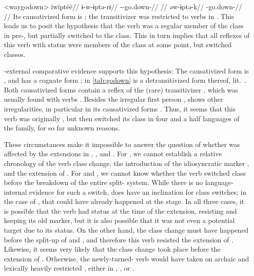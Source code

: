 \pex<waygodown>\wayana \parencite[][200]{wayanatavares2005}
\begingl
\glpreamble ïwïptëë//
\gla ɨ-w-ɨptə-rɨ//
\glb {}--go.down-//
\glft {}//
\endgl
{}
\begingl
\gla əw-ɨptə-k//
\glb {}-go.down-//
\glft {}//
\endgl
\xe
%
Its causativized form is  \parencite[255]{wayanatavares2005}; the transitivizer  was restricted to  verbs in \PC \parencite{gildea2019overview}.
This leads us to posit the hypothesis that the verb was a regular member of the  class in pre-\wayana, but partially switched to the  class.
This in turn implies that all reflexes of this verb with  status were members of the  class at some point, but switched classes.

\wayana-external comparative evidence supports this hypothesis:
The \arara causativized form is  \parencite[66]{alves2017arara}, and \kalina has a cognate form  \parencite[263]{courtz2008carib};   in \cref{tab:godown} is a detransitivized form thereof, lit.\ .
Both causativized forms contain a reflex of the (rare) transitivizer , which was usually found with  verbs \parencite{gildea2019overview}.
Besides the irregular first person , \trio {} shows other irregularities, in particular in its causativized forms \parencite[263]{triomeira1999}.
Thus, it seems that this verb was originally , but then switched its class in four and a half languages of the family, for so far unknown reasons.

These circumstances make it impossible to answer the question of whether  was affected by the extensions in \PTir, \carijo, and \yukpa.
For \PTir, we cannot establish a relative chronology of the verb class change, the introduction of the idiosyncratic marker , and the extension of .
For \carijo and \yukpa, we cannot know whether the verb switched class before the breakdown of the entire split- system.
While there is no language-internal evidence for such a switch,  does have an inclination for class switches; in the case of \carijo, that could have already happened at the \PTar stage.
In all three cases, it is possible that the verb had  status at the time of the extension, resisting and keeping its old marker, but it is also possible that it was not even a potential target due to its  status.
On the other hand, the class change must have happened before the split-up of \trio and \akuriyo, and therefore this verb resisted the extension of \akuriyo {}.
Likewise, it seems very likely that the class change took place before the extension of \PPek {}.
Otherwise, the newly-turned- verb would have taken on archaic and lexically heavily restricted , either in \PTar, \PXin, or \arara. 


